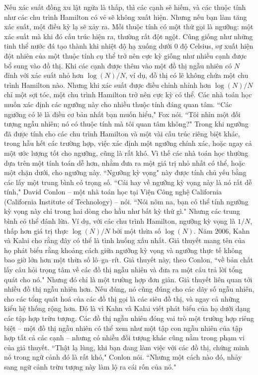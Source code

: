 \begin{multicols}{2}
	Nếu xác suất đồng xu lật ngửa là thấp, thì các cạnh sẽ hiếm, và các thuộc tính như các chu trình Hamilton có vẻ sẽ không xuất hiện. Nhưng nếu bạn làm tăng xác suất, một điều kỳ lạ sẽ xảy ra. Mỗi thuộc tính có một thứ gọi là ngưỡng: một xác suất mà khi đó cấu trúc hiện ra, thường rất đột ngột. Cũng giống như những tinh thể nước đá tạo thành khi nhiệt độ hạ xuống dưới $0$ độ Celsius, sự xuất hiện đột nhiên của một thuộc tính cụ thể trở nên cực kỳ giống như nhiều cạnh được bổ sung vào đồ thị. Khi các cạnh được thêm vào một đồ thị ngẫu nhiên có $N$ đỉnh với xác suất nhỏ hơn $\log(N)/N$, ví dụ, đồ thị có lẽ không chứa một chu trình Hamilton nào. Nhưng khi xác suất được điều chỉnh nhỉnh hơn $\log(N)/N$ chỉ một sợi tóc, một chu trình Hamilton trở nên cực kỳ có thể.
	\vskip 0.1cm
	Các nhà toán học muốn xác định các ngưỡng này cho nhiều thuộc tính đáng quan tâm. ``Các ngưỡng có lẽ là điều cơ bản nhất bạn muốn hiểu," Fox nói. ``Tôi nhìn một đối tượng ngẫu nhiên; nó có thuộc tính mà tôi quan tâm không?" Trong khi ngưỡng đã được tính cho các chu trình Hamilton và một vài cấu trúc riêng biệt khác, trong  hầu hết các trường hợp, việc xác định một ngưỡng chính xác, hoặc ngay cả một ước lượng tốt cho ngưỡng, cũng là rất khó.
	\vskip 0.1cm
	Vì thế các nhà toán học thường dựa trên một tính toán dễ hơn, nhằm đưa ra một giá trị nhỏ nhất có thể, hoặc một chặn dưới, cho ngưỡng này. ``Ngưỡng kỳ vọng" này được tính chủ yếu bằng các lấy một trung bình có trọng số. ``Cái hay về ngưỡng kỳ vọng này là nó rất dễ tính," David Conlon -- một nhà toán học tại Viện Công nghệ California (California Institute of Technology) -- nói. ``Nói nôm na, bạn có thể tính ngưỡng kỳ vọng này chỉ trong hai dòng cho hầu như bất kỳ thứ gì."
	\vskip 0.1cm
	Nhưng các trung bình có thể đánh lừa. Ví dụ, với các chu trình Hamilton, ngưỡng kỳ vọng là  $1/N$, thấp hơn giá trị thực $\log(N)/N$ bởi một thừa số $\log(N)$.
	\vskip 0.1cm
	Năm $2006$, Kahn và Kalai cho rằng đây có thể là tình huống xấu nhất. Giả thuyết mang tên của họ phát biểu rằng khoảng cách giữa ngưỡng kỳ vọng và ngưỡng thực tế không bao giờ lớn hơn một thừa số lô--ga--rít. Giả thuyết này, theo Conlon, ``về bản chất lấy câu hỏi trọng tâm về các đồ thị ngẫu nhiên và đưa ra một câu trả lời tổng quát cho nó."
	\vskip 0.1cm
	Nhưng đó chỉ là một trường hợp đơn giản. Giả thuyết liên quan tới nhiều đồ thị ngẫu nhiên hơn. Nếu đúng, nó cũng đúng cho các dãy số ngẫu nhiên, cho các tổng quát hoá của các đồ thị gọi là các siêu đồ thị, và ngay cả những kiểu hệ thống rộng hơn. Đó là vì Kahn và Kalai viết phát biểu của họ dưới dạng các tập hợp trừu tượng. Các đồ thị ngẫu nhiên đóng vai trò một trường hợp riêng biệt -- một đồ thị ngẫu nhiên có thể xem như một tập con ngẫu nhiên của tập hợp tất cả các cạnh -- nhưng có nhiều đối tượng khác cũng nằm trong phạm vi của giả thuyết. ``Thật lạ lùng, khi bạn đang làm việc với các đồ thị, chứng minh nó trong ngữ cảnh đó là rất khó," Conlon nói. ``Nhưng một cách nào đó, nhảy sang ngữ cảnh trừu tượng này làm lộ ra cái rốn của nó."

\end{multicols}
